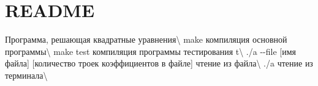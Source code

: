\chapter{README}
\hypertarget{md_README}{}\label{md_README}
Программа, решающая квадратные уравнения\textbackslash{} {\ttfamily make} компиляция основной программы\textbackslash{} {\ttfamily make test} компиляция программы тестирования {\ttfamily t}\textbackslash{} {\ttfamily ./a -\/-\/file \mbox{[}имя файла\mbox{]} \mbox{[}количество троек коэффициентов в файле\mbox{]}} чтение из файла\textbackslash{} {\ttfamily ./a} чтение из терминала\textbackslash{} 